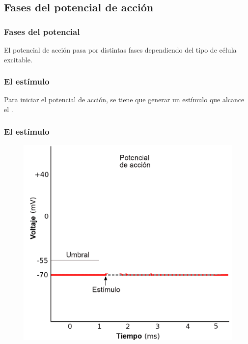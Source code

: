 \documentclass[14pt]{beamer}
\begin{document}
\subsection{Fases del potencial de acción}

\begin{frame}
\frametitle{Fases del potencial}
El potencial de acción pasa por distintas fases dependiendo del tipo de célula excitable.
\end{frame}
\begin{frame}
\frametitle{El estímulo}
Para iniciar el potencial de acción, se tiene que generar un estímulo que alcance el .
\end{frame}
\begin{frame}
\frametitle{El estímulo}
\begin{figure}
    \centering
    \includegraphics[scale=0.5]{Imagenes/Potencial_Accion_08a.png}
\end{figure}
\end{frame}
\end{document}
